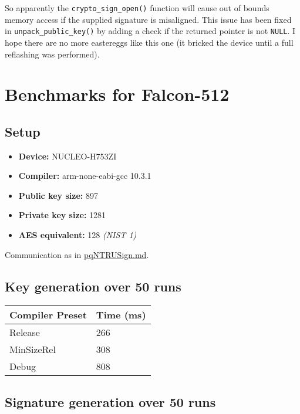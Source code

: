 \documentclass[
]{article}
\providecommand{\tightlist}{%
  \setlength{\itemsep}{0pt}\setlength{\parskip}{0pt}}
\begin{document}
So apparently the \texttt{crypto\_sign\_open()} function will cause out
of bounds memory access if the supplied signature is misaligned. This
issue has been fixed in \texttt{unpack\_public\_key()} by adding a check
if the returned pointer is not \texttt{NULL}. I hope there are no more
eastereggs like this one (it bricked the device until a full reflashing
was performed).

\hypertarget{benchmarks-for-falcon-512}{%
\section{Benchmarks for Falcon-512}\label{benchmarks-for-falcon-512}}

\hypertarget{setup-1}{%
\subsection{Setup}\label{setup-1}}

\begin{itemize}
\tightlist
\item
  \textbf{Device:} NUCLEO-H753ZI
\item
  \textbf{Compiler:} arm-none-eabi-gcc 10.3.1
\item
  \textbf{Public key size:} 897
\item
  \textbf{Private key size:} 1281
\item
  \textbf{AES equivalent:} 128 \textit{(NIST 1)}
\end{itemize}

Communication as in \url{pqNTRUSign.md}.

\hypertarget{key-generation-over-50-runs}{%
\subsection{Key generation over 50
runs}\label{key-generation-over-50-runs}}

\begin{longtable}[]{@{}ll@{}}
\toprule
Compiler Preset & Time (ms)\tabularnewline
\midrule
\endhead
Release & 266\tabularnewline
MinSizeRel & 308\tabularnewline
Debug & 808\tabularnewline
\bottomrule
\end{longtable}

\hypertarget{signature-generation-over-50-runs}{%
\subsection{Signature generation over 50
runs}\label{signature-generation-over-50-runs}}
\end{document}
